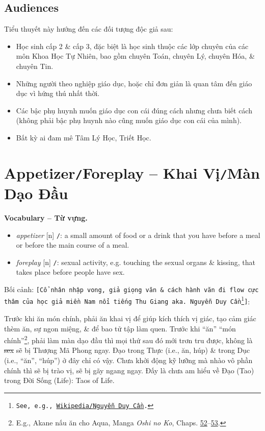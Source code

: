 \documentclass[12pt,oneside]{book}
\begin{document}
\section*{Audiences}
Tiểu thuyết này hướng đến các đối tượng độc giả sau:
\begin{itemize}
	\item Học sinh cấp 2 \& cấp 3, đặc biệt là học sinh thuộc các lớp chuyên của các môn Khoa Học Tự Nhiên, bao gồm chuyên Toán, chuyên Lý, chuyên Hóa, \& chuyên Tin.
	\item Những người theo nghiệp giáo dục, hoặc chỉ đơn giản là quan tâm đến giáo dục vì hứng thú nhất thời.
	\item Các bậc phụ huynh muốn giáo dục con cái đúng cách nhưng chưa biết cách (không phải bậc phụ huynh nào cũng muốn giáo dục con cái của mình).
	\item Bất kỳ ai đam mê Tâm Lý Học, Triết Học.
\end{itemize}


\chapter{Appetizer{\tt/}Foreplay -- Khai Vị{\tt/}Màn Dạo Đầu}
\minitoc
\noindent\textbf{\textsf{\small Vocabulary -- Từ vựng.}}
\begin{itemize}\small\sf
	\item {\it appetizer} [n] {\tt/}: a small amount of food or a drink that you have before a meal or before the main course of a meal.
	\item {\it foreplay} [n] {\tt/}: sexual activity, e.g. touching the sexual organs \& kissing, that takes place before people have sex.
\end{itemize}
{\sf Bối cảnh}: {\tt[Cổ nhân nhập vong, giả giọng văn \& cách hành văn đi flow cực thâm của học giả miền Nam nổi tiếng {\sc Thu Giang} aka. {\sc Nguyễn Duy Cần}\footnote{See, e.g., \href{https://vi.wikipedia.org/wiki/Nguyen_Duy_Can}{Wikipedia{\tt/}{\sc Nguyễn Duy Cần}}.}]}:

Trước khi ăn món chính, phải ăn khai vị để giúp kích thích vị giác, tạo cảm giác thèm ăn, sự ngon miệng, \& để bao tử tập làm quen. Trước khi ``ăn'' ``món chính''\footnote{E.g., {\sf Akane} nấu ăn cho {\sf Aqua}, Manga {\it Oshi no Ko}, Chaps. \href{https://readoshino.com/manga/oshi-no-ko-chapter-52/}{52}--\href{https://readoshino.com/manga/oshi-no-ko-chapter-53/}{53}.}, phải làm màn dạo đầu thì mọi thứ sau đó mới trơn tru được, không là \st{sex} sẽ bị Thượng Mã Phong ngay. Đạo trong Thực (i.e., ăn, húp) \& trong Dục (i.e., ``ăn'', ``húp'') ở đây chỉ có vậy. Chưa khởi động kỹ lưỡng mà nhào vô phần chính thì sẽ bị trào vị, sẽ bị gãy ngang ngay. Đấy là chưa am hiểu về Đạo (Tao) trong Đời Sống (Life): Taos of Life.
\end{document}
